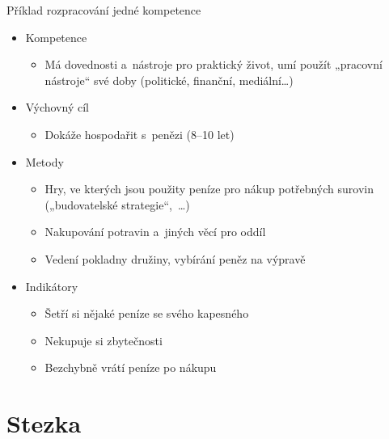 \documentclass[hyperref={bookmarks=true, unicode=true, colorlinks=true, plainpages=false, pdfkeywords={Skaut, Junak, Skauting, Vychovna metoda}, linkcolor=OrangeRed, anchorcolor=OrangeRed, citecolor=RawSienna, filecolor=RawSienna, menucolor=OrangeRed, urlcolor=RawSienna, pdftex}, compress, xelatex, xcolor=dvipsnames, print]{beamer}
\begin{document}
\begin{frame}{Příklad rozpracování jedné kompetence}
\begin{itemize}
\item Kompetence
 \begin{itemize}
 \item Má dovednosti a~nástroje pro praktický život, umí použít „pracovní nástroje“ své doby (politické, finanční, mediální\ldots)
 \end{itemize}
\item Výchovný cíl
 \begin{itemize}
 \item Dokáže hospodařit s~penězi (8--10 let)
 \end{itemize}
\item Metody
 \begin{itemize}
 \item Hry, ve kterých jsou použity peníze pro nákup potřebných surovin („budovatelské strategie“,~\ldots)
 \item Nakupování potravin a~jiných věcí pro oddíl
 \item Vedení pokladny družiny, vybírání peněz na výpravě
 \end{itemize}
\item Indikátory
\begin{itemize}
 \item Šetří si nějaké peníze se svého kapesného
 \item Nekupuje si zbytečnosti
 \item Bezchybně vrátí peníze po nákupu
\end{itemize}
\end{itemize}
\end{frame}

\section{Stezka}
\end{document}
